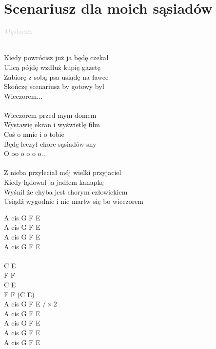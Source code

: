 \documentclass[a5paper, 10pt]{book}
\begin{document}
\section{Scenariusz dla moich sąsiadów}\textcolor{lightgray}{\textit{Myslovitz}}\\~\\
\begin{minipage}[t]{0.8\textwidth}
  Kiedy powrócisz już ja będę czekał\\
  Ulicą pójdę wzdłuż kupię gazetę\\
  Zabiorę z sobą psa usiądę na ławce\\
  Skończę scenariusz by gotowy był\\
  Wieczorem...\\
  \\
  \hspace*{5mm}Wieczorem przed mym domem\\
  \hspace*{5mm}Wystawię ekran i wyświetlę film\\
  \hspace*{5mm}Coś o mnie i o tobie\\
  \hspace*{5mm}Będę leczył chore sąsiadów sny\\

  \hspace*{8mm}O oo o o o o...\\
  \\
  Z nieba przyleciał mój wielki przyjaciel\\
  Kiedy lądował ja jadłem kanapkę\\
  Wyśnił że chyba jest chorym człowiekiem\\
  Usiądź wygodnie i nie martw się bo wieczorem\\
\end{minipage}
\begin{minipage}[t]{0.2\textwidth}
  A cis G F E\\
  A cis G F E\\
  A cis G F E\\
  A cis G F E\\

  ~\\
  C E\\
  F F\\
  C E\\
  F F (C E)\\

  A cis G F E $/ \times$2\\

  A cis G F E\\
  A cis G F E\\
  A cis G F E\\
  A cis G F E\\

\end{minipage}
\end{document}
